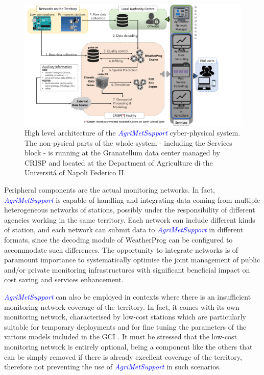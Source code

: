 \documentclass[authoryear,preprint,review,12pt]{elsarticle}
\newcommand{\note}[1]{\emph{\textcolor{red}{#1}}}
\newcommand{\update}[1]{\emph{\textcolor{blue}{#1}}}
\newcommand{\gci}{\update{AgriMetSupport}\xspace}
\begin{document}
\begin{figure}
	\centering
	\includegraphics[scale=.5]{figures/AgriMetSupport-fig.pdf}
	\caption{High level architecture of the \gci cyber-physical system.
             The non-pysical parts of the whole system - including the Services block - is running at the Granatellum data center managed by CRISP and located at the Department of Agriculture di the Universit\'a of Napoli Federico II.
 }
	\label{cyberPhysicalSystemFig}
\end{figure}

Peripheral components are the actual monitoring networks.
In fact, \gci is capable of handling and integrating data coming from multiple heterogeneous networks of stations, possibly under the responsibility of different agencies working in the same territory.
Each network can include different kinds of station, and each network can submit data to \gci in different formats, since the decoding module of WeatherProg can be configured to accommodate such differences.
The opportunity to integrate networks is of paramount importance to systematically optimise the joint management of public and/or private monitoring infrastructures with significant beneficial impact on cost saving and services enhancement.

\gci can also be employed in contexts where there is an insufficient monitoring network coverage of the territory.
In fact, it comes with its own monitoring network, characterised by low-cost stations which are particularly suitable for temporary deployments and for fine tuning the parameters of the various models included in the GCI \citep{Martino2019AFI}.
It must be stressed that the low-cost monitoring network is entirely optional, being a component like the others that can be simply removed if there is already excellent coverage of the territory, therefore not preventing the use of \gci in such scenarios. %
\end{document}

